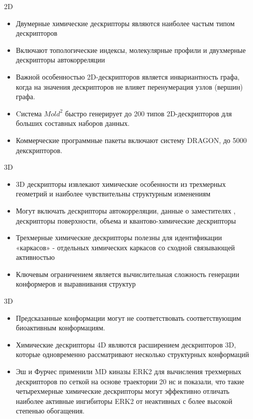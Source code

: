 \begin{frame}{2D}
    \begin{itemize}
        \item Двумерные химические дескрипторы являются наиболее частым типом дескрипторов
        \item Включают топологические индексы, молекулярные профили и двухмерные дескрипторы автокорреляции 
        \item Важной особенностью 2D-дескрипторов  является инвариантность графа, когда на значения дескрипторов не влияет перенумерация узлов (вершин) графа. 
        \item Cистема $Mold^2$ быстро генерирует до 200 типов 2D-дескрипторов для больших составных наборов данных. 
        \item Коммерческие программные пакеты  включают систему DRAGON, до 5000 декскрипторов. 
    \end{itemize}
\end{frame}

\begin{frame}{3D}
    \begin{itemize}
        \item 3D дескрипторы извлекают химические особенности из трехмерных геометрий  и наиболее чувствительны структурным изменениям 
        \item Могут  включать дескрипторы автокорреляции, данные о заместителях , дескрипторы поверхности, объема и квантово-химические дескрипторы
        \item Трехмерные химические дескрипторы полезны для идентификации «каркасов» - отдельных химических каркасов со сходной связывающей активностью
        \item Ключевым ограничением является вычислительная сложность генерации конформеров и выравнивания структур
     \end{itemize}
\end{frame}
\begin{frame}{3D}
    \begin{itemize}
        \item Предсказанные конформации могут не соответствовать соответствующим биоактивным конформациям.
        \item Химические дескрипторы 4D являются расширением  дескрипторов 3D, которые одновременно рассматривают несколько структурных конформаций 
        \item  Эш и Фурчес применили MD киназы ERK2 для вычисления трехмерных дескрипторов по сеткой на основе траектории 20 нс и показали, что такие четырехмерные химические дескрипторы могут эффективно отличать наиболее активные ингибиторы ERK2 от неактивных с более высокой степенью обогащения. 
     \end{itemize}
\end{frame}

